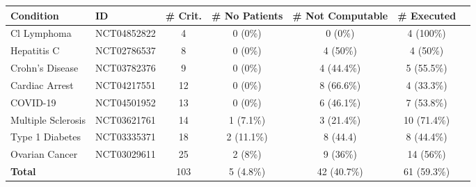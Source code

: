 \def\arraystretch{1.0}
\begin{tabular}{l l c c c c c}
    \textbf{Condition} & \textbf{ID} & \textbf{\# Crit.} & \textbf{\# No Patients} & \textbf{\# Not Computable} & \textbf{\# Executed} \\
    \toprule
    Cl Lymphoma        & \footnotesize{NCT04852822} & 4  & 0 (0\%)    & 0 (0\%)    & 4  (100\%)  \\
    Hepatitis C        & \footnotesize{NCT02786537} & 8  & 0 (0\%)    & 4 (50\%)   & 4  (50\%)   \\
    Crohn's Disease    & \footnotesize{NCT03782376} & 9  & 0 (0\%)    & 4 (44.4\%) & 5  (55.5\%) \\
    Cardiac Arrest     & \footnotesize{NCT04217551} & 12 & 0 (0\%)    & 8 (66.6\%) & 4  (33.3\%) \\
    COVID-19           & \footnotesize{NCT04501952} & 13 & 0 (0\%)    & 6 (46.1\%) & 7  (53.8\%) \\
    Multiple Sclerosis & \footnotesize{NCT03621761} & 14 & 1 (7.1\%)  & 3 (21.4\%) & 10 (71.4\%) \\
    Type 1 Diabetes    & \footnotesize{NCT03335371} & 18 & 2 (11.1\%) & 8 (44.4)   & 8  (44.4\%) \\
    Ovarian Cancer     & \footnotesize{NCT03029611} & 25 & 2 (8\%)    & 9 (36\%)   & 14 (56\%)   \\
    \bottomrule
    \textbf{Total} &     & 103 & 5 (4.8\%) & 42 (40.7\%) & 61 (59.3\%)
\end{tabular}